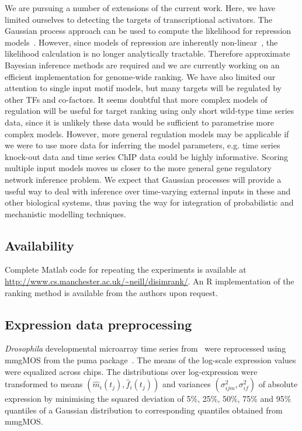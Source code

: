 \documentclass{pnastwo}
\begin{document}
\begin{article}
We are pursuing a number of extensions of the current work. Here, we
have limited ourselves to detecting the targets of transcriptional activators. The
Gaussian process approach can be used to compute the likelihood for
repression models~\cite{Gao2008}. However, since models of repression
are inherently non-linear~\cite{Khanin2006}, the likelihood calculation is no longer analytically
tractable. Therefore approximate Bayesian inference methods are
required and we are currently working on an efficient implementation
for genome-wide ranking. We have also limited our attention
to single input motif models, but many targets will be regulated by other TFs and
co-factors. It seems doubtful that more complex models of regulation
will be useful for target ranking using only short wild-type time
series data, since it is unlikely these data would be sufficient to parametrise more complex models. However,
more general regulation models may be applicable if we were to use more data for
inferring the model parameters, e.g. time series knock-out data and time series
ChIP data could be highly informative. Scoring multiple input
models moves us closer to the more general gene regulatory network inference
problem. We expect that Gaussian processes will provide a useful way
to deal with inference over time-varying external inputs in these and other
biological systems, thus paving the way for integration of
probabilistic and mechanistic modelling techniques.

\subsection{Availability}
Complete Matlab code for repeating the experiments is available at
\url{http://www.cs.manchester.ac.uk/~neill/disimrank/}.
An R implementation of
the ranking method is available from the authors upon request.

\begin{materials}
  \section{Expression data preprocessing} {\it Drosophila} developmental
  microarray time series from~\cite{Tomancak2002} were reprocessed
  using mmgMOS from the puma package~\cite{Pearson2009}.  The means of
  the log-scale expression values were equalized across chips.  The
  distributions over log-expression were transformed to means
  $\left(\hat{m}_i(t_j), \hat{f}_i(t_j)\right)$ and variances $\left(\sigma_{ijm}^2,
  \sigma_{if}^2 \right)$ of absolute expression by minimising the squared
  deviation of 5\%, 25\%, 50\%, 75\% and 95\% quantiles of a Gaussian
  distribution to corresponding quantiles obtained from mmgMOS.


\end{materials}
\end{article}
\end{document}
